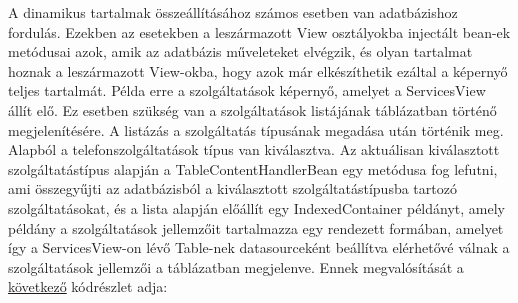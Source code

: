 \documentclass[centeredchapter]{thesis-ekf}
\theoremstyle{definition}
\theoremstyle{remark}
\begin{document}
A dinamikus tartalmak összeállításához számos esetben van adatbázishoz fordulás. Ezekben az esetekben a leszármazott View osztályokba injectált bean-ek metódusai azok, amik az adatbázis műveleteket elvégzik, és olyan tartalmat hoznak a leszármazott View-okba, hogy azok már elkészíthetik ezáltal a képernyő teljes tartalmát. Példa erre a szolgáltatások képernyő, amelyet a ServicesView állít elő. Ez esetben szükség van a szolgáltatások listájának táblázatban történő megjelenítésére.
A listázás a szolgáltatás típusának megadása után történik meg. Alapból a telefonszolgáltatások típus van kiválasztva. Az aktuálisan kiválasztott szolgáltatástípus alapján a TableContentHandlerBean egy metódusa fog lefutni, ami összegyűjti az adatbázisból a kiválasztott szolgáltatástípusba tartozó szolgáltatásokat, és a lista alapján előállít egy IndexedContainer példányt, amely példány a szolgáltatások jellemzőit tartalmazza egy rendezett formában, amelyet így a ServicesView-on lévő Table-nek datasourceként beállítva elérhetővé válnak a szolgáltatások jellemzői a táblázatban megjelenve.
Ennek megvalósítását a \hyperlink{figure-tablecontenthandlerbean}{következő} kódrészlet adja:

\hypertarget{figure-tablecontenthandlerbean}{}

\end{document}
